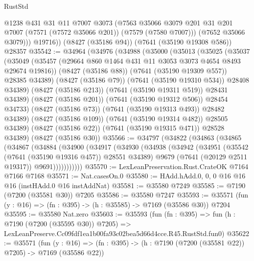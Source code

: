 \begin{lexlean}{RustStd}
\begin{coremodule}
            @1238
            @431
            @31
            @11
            @7007
            @3073
            (@7563
              @35066
              @3079
              @201
              @31
              @201
              @7007
              (@7571 (@7572 @35066 @201))
              (@7579 (@7580 @7007)))
            (@7652 @35066 @3079)))
        @19716))
    (@8427 (@35186 @94))
    (@7641 (@35190 @19308 @586))
    @28357
@35542 := @34964
    (@34976
      (@34988
        (@35000
          (@35013
            (@35025
              (@35037
                (@35049
                  (@35457 (@29664 @860 @1464 @431 @11 @3053 @3073 @4654 @8493 @29674 @19816))
                  (@8427 (@35186 @88))
                  (@7641 (@35190 @19309 @557))
                  @28385
                  @34389)
                (@8427 (@35186 @79))
                (@7641 (@35190 @19310 @534))
                @28408
                @34389)
              (@8427 (@35186 @213))
              (@7641 (@35190 @19311 @519))
              @28431
              @34389)
            (@8427 (@35186 @201))
            (@7641 (@35190 @19312 @506))
            @28454
            @34733)
          (@8427 (@35186 @73))
          (@7641 (@35190 @19313 @493))
          @28482
          @34389)
        (@8427 (@35186 @109))
        (@7641 (@35190 @19314 @482))
        @28505
        @34389)
      (@8427 (@35186 @22))
      (@7641 (@35190 @19315 @471))
      @28528
      @34389)
    (@8427 (@35186 @30))
@35566 := @34797
    (@34822
      (@34863
        (@34865
          (@34867
            (@34884
              (@34900
                (@34917
                  (@34930
                    (@34938
                      (@34942
                        (@34951
                          (@35542 (@7641 (@35190 @19316 @457)) @28551 @34389)
                          @9679
                          (@7641 (@20129 @2511 @19317))
                          @9691)))))))))))
@35570 := LexLeanPreservation.Rust.CrateOK @7164 @7166 @7168
@35571 := Nat.casesOn.{0}
@35580 := HAdd.hAdd.{0, 0, 0} @16 @16 @16 (instHAdd.{0} @16 instAddNat)
@35581 := @35580 @7249
@35585 := @7190 (@7200 (@35581 @30)) @7205
@35586 := @35580 @7247
@35593 := @35571 (fun (y : @16) => (fn : @395) -> (h : @35585) -> @7169 (@35586 @30)) @7204
@35595 := @35580 Nat.zero
@35603 := @35593
    (fun (fn : @395) =>
    fun (h : @7190 (@7200 (@35595 @30)) @7205) =>
    LexLeanPreserve.Cc09fdf1ea1b00fa93c02bea5d66d4cce.R45.RustStd.fun0)
@35622 := @35571
    (fun (y : @16) => (fn : @395) -> (h : @7190 (@7200 (@35581 @22)) @7205) -> @7169 (@35586 @22))

\end{coremodule}
\end{lexlean}
